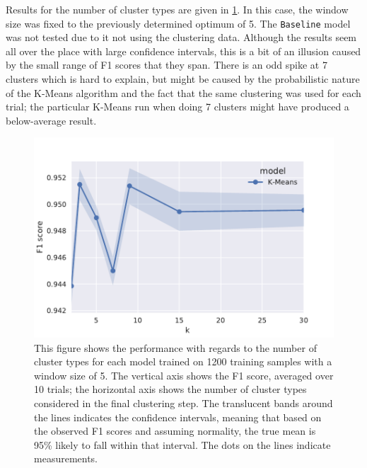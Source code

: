 Results for the number of cluster types are given in \cref{fig:numcluster}. In
this case, the window size was fixed to the previously determined optimum of 5.
The \texttt{Baseline} model was not tested due to it not using the clustering
data.  Although the results seem all over the place with large confidence
intervals, this is a bit of an illusion caused by the small range of F1 scores
that they span. There is an odd spike at 7 clusters which is hard to explain,
but might be caused by the probabilistic nature of the K-Means algorithm and the
fact that the same clustering was used for each trial; the particular K-Means
run when doing 7 clusters might have produced a below-average result.
\begin{figure}[tb]
  \centering
  \includegraphics[width=\textwidth]{figures/results/800-numcluster/tseries_f1.pdf}
  \caption{This figure shows the performance with regards to the number of
    cluster types for each model trained on 1200 training samples with a window
    size of 5.  The vertical axis shows the F1 score, averaged over 10 trials;
    the horizontal axis shows the number of cluster types considered in the
    final clustering step.  The translucent bands around the lines indicates the
    confidence intervals, meaning that based on the observed F1 scores and
    assuming normality, the true mean is 95\% likely to fall within that interval.
    The dots on the lines indicate measurements.\label{fig:numcluster}}
\end{figure}

